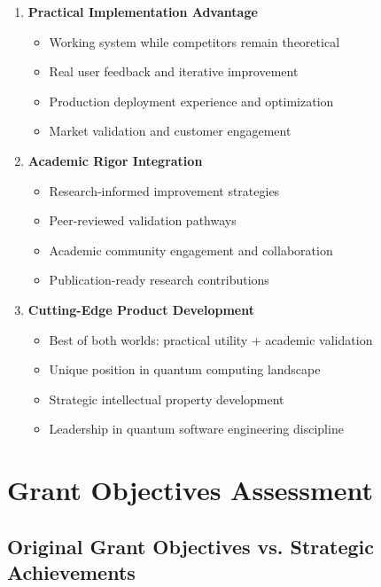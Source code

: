 \documentclass[12pt,a4paper]{article}
\begin{document}
\begin{enumerate}
    \item \textbf{Practical Implementation Advantage}
    \begin{itemize}
        \item Working system while competitors remain theoretical
        \item Real user feedback and iterative improvement
        \item Production deployment experience and optimization
        \item Market validation and customer engagement
    \end{itemize}
    
    \item \textbf{Academic Rigor Integration}
    \begin{itemize}
        \item Research-informed improvement strategies
        \item Peer-reviewed validation pathways
        \item Academic community engagement and collaboration
        \item Publication-ready research contributions
    \end{itemize}
    
    \item \textbf{Cutting-Edge Product Development}
    \begin{itemize}
        \item Best of both worlds: practical utility + academic validation
        \item Unique position in quantum computing landscape
        \item Strategic intellectual property development
        \item Leadership in quantum software engineering discipline
    \end{itemize}
\end{enumerate}

\section{Grant Objectives Assessment}

\subsection{Original Grant Objectives vs. Strategic Achievements}
\end{document}
